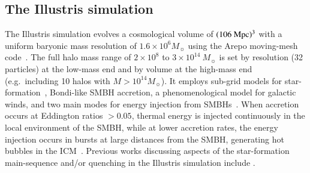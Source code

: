 \documentclass[preprint2,tighten]{aastex62}
\begin{document}



\subsection{The Illustris simulation}
The Illustris simulation \citep{vogelsberger2014,genel2014} evolves a
cosmological volume of $(106\ \rm{Mpc})^3$ with a uniform baryonic mass
resolution of $1.6\times10^6M_{\sun}$ using the Arepo moving-mesh 
code~\citep{springel2010}. 
The full halo mass range of $2 \times 10^8$ to $3\times 10^{14}\ M_{\sun}$ 
is set by resolution (32 particles) at the low-mass end and by volume at 
the high-mass end (e.g.~including 10 halos with $M>10^{14}M_{\sun}$). 
It employs sub-grid models for star-formation~\citep{springel2003},
Bondi-like SMBH accretion, a phenomenological model for galactic winds, and 
two main modes for energy injection from SMBHs~\citep[\emph{see}][]{vogelsberger2013}. 
When accretion occurs at Eddington ratios $>0.05$, thermal energy is 
injected continuously in the local environment of the SMBH, while at 
lower accretion rates, the energy injection occurs in bursts at large
distances from the SMBH, generating hot bubbles in the ICM~\citep{sijacki2007}.
Previous works discussing aspects of the star-formation main-sequence and/or
quenching in the Illustris simulation include 
\citet{vogelsberger2014, sparre2015, bluck2016, terrazas2017}.
\end{document}
